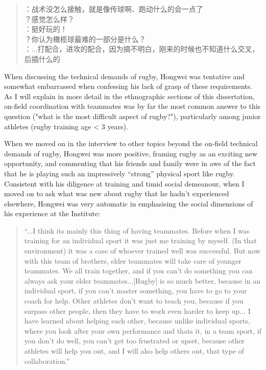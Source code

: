 \begin{CJK}{UTF8}{gbsn}
  \begin{quotation}
    ：战术没怎么接触，就是像传球啊、跑动什么的会一点了 \\
    ？感觉怎么样？\\
    ：挺好玩的！\\
    ？你认为橄榄球最难的一部分是什么？ \\
    ：...打配合，进攻的配合，因为搞不明白，刚来的时候也不知道什么交叉，后插什么的 \\
  \end{quotation}
\end{CJK}


When discussing the technical demands of rugby, Hongwei was tentative and somewhat embarrassed when confessing his lack of grasp of these requirements. As I will explain in more detail in the ethnographic sections of this dissertation, on-field coordination with teammates was by far the most common answer to this question ("what is the most difficult aspect of rugby?"), particularly among junior athletes (rugby training age < 3 years).

When we moved on in the interview to other topics beyond the on-field technical demands of rugby, Hongwei was more positive, framing rugby as an exciting new opportunity, and commenting that his friends and family were in awe of the fact that he is playing such an impressively ``strong'' physical sport like rugby.  Consistent with his diligence at training and timid social demeanour, when I moved on to ask what was new about rugby that he hadn't experienced elsewhere, Hongwei was very automatic in emphasising the social dimensions of his experience at the Institute:

\begin{quotation}
  ``...I think its mainly this thing of having teammates. Before when I was training for an individual sport it was just me training by myself. (In that environment) it was a case of whoever trained well was successful.  But now with this team of brothers, elder teammates will take care of younger teammates. We all train together, and if you can’t do something you can always ask your elder teammates...[Rugby] is so much better, because in an individual sport, if you can’t master something, you have to go to your coach for help. Other athletes don’t want to teach you, because if you surpass other people, then they have to work even harder to keep up... I have learned about helping each other, because unlike individual sports, where you look after your own performance and thats it, in a team sport, if you don’t do well, you can’t get too frustrated or upset, because other athletes will help you out, and I will also help others out, that type of collaboration.''
\end{quotation}

